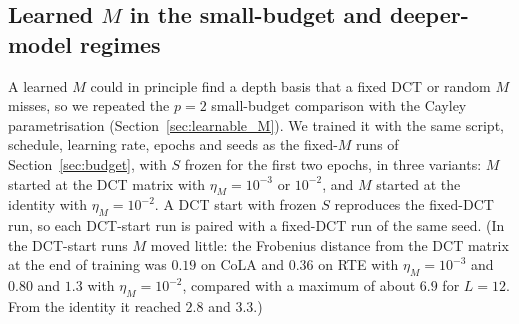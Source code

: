 \documentclass{article}
\theoremstyle{plain}
\begin{document}
\subsection{Learned $M$ in the small-budget and deeper-model regimes}
\label{sec:cayley_budget}

A learned $M$ could in principle find a depth basis that a fixed DCT or random $M$ misses, so we repeated the $p=2$ small-budget comparison with the Cayley parametrisation (Section~\ref{sec:learnable_M}).
We trained it with the same script, schedule, learning rate, epochs and seeds as the fixed-$M$ runs of Section~\ref{sec:budget}, with $S$ frozen for the first two epochs, in three variants:
$M$ started at the DCT matrix with $\eta_M=10^{-3}$ or $10^{-2}$, and $M$ started at the identity with $\eta_M=10^{-2}$.
A DCT start with frozen $S$ reproduces the fixed-DCT run, so each DCT-start run is paired with a fixed-DCT run of the same seed.
(In the DCT-start runs $M$ moved little: the Frobenius distance from the DCT matrix at the end of training was $0.19$ on CoLA and $0.36$ on RTE with $\eta_M=10^{-3}$ and $0.80$ and $1.3$ with $\eta_M=10^{-2}$, compared with a maximum of about $6.9$ for $L=12$.
From the identity it reached $2.8$ and $3.3$.)
\end{document}
